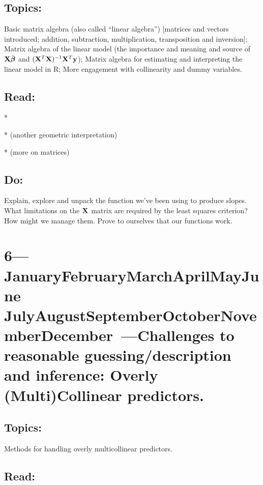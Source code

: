 \documentclass[10pt]{article}
\def\themonth{\ifcase\month\or
  January\or February\or March\or April\or May\or June\or
  July\or August\or September\or October\or November\or December\fi}
\begin{document}

\subsection{Topics:} Basic matrix algebra (also called ``linear
algebra'') [matrices and vectors introduced; addition, subtraction,
multiplication, transposition and inversion]; Matrix algebra of the
linear model (the importance and meaning and source of $\mathbf{X} \hat{\boldsymbol{\beta}}$ and
$(\mathbf{X}^{T}\mathbf{X})^{-1} \mathbf{X}^{T}\mathbf{y}$); Matrix algebra for estimating and
interpreting the linear model in R; More engagement with collinearity
and dummy variables.

\subsection{Read:}
*\citealp[Appendix B.1.0--B.1.3 and Chap 9]{fox2008applied}

*\citealp[Chap 10]{fox2008applied} (another geometric interpretation)

*\citealp[Appendix B]{fox2008applied} (more on matrices)

\subsection{Do:} Explain, explore and unpack the function we've been
using to produce slopes. What limitations on the $\mathbf{X}$ matrix are
required by the least squares criterion? How might we manage
them. Prove to ourselves that our functions work.

\AdvanceDate[7] 
\section{6---\themonth~\the\day---Challenges to reasonable guessing/description
  and inference:  Overly (Multi)Collinear
  predictors.}

\subsection{Topics:} Methods for handling overly multicollinear predictors.

\subsection{Read:}
\end{document}
